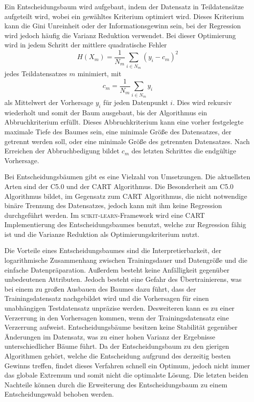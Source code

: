 Ein Entscheidungsbaum wird aufgebaut, indem der Datensatz in Teildatensätze aufgeteilt wird, wobei ein gewähltes Kriterium optimiert wird.
Dieses Kriterium
kann die Gini Unreinheit oder der Informationsgewinn sein, bei der Regression wird jedoch häufig die Varianz Reduktion verwendet.
Bei dieser Optimierung wird in jedem Schritt der mittlere quadratische Fehler
\begin{equation}
  H(X_m) = \frac{1}{N_m}\sum_{i\in N_m}(y_i-c_m)^2
\end{equation}
jedes Teildatensatzes $m$ minimiert, mit
\begin{equation}
  c_m = \frac{1}{N_m}\sum_{i\in N_m}y_i
\end{equation}
als Mittelwert der Vorhersage $y_i$ für jeden Datenpunkt $i$.
Dies wird rekursiv wiederholt und somit der Baum ausgebaut, bis der Algorithmus ein Abbruchkriterium erfüllt.
Dieses Abbruchkriterium kann eine vorher festgelegte maximale Tiefe
des Baumes sein, eine minimale Größe des Datensatzes, der getrennt werden soll, oder eine minimale Größe des getrennten Datensatzes. Nach Erreichen der Abbruchbedigung bildet
$c_m$ des letzten Schrittes die endgültige Vorhersage.

Bei Entscheidungsbäumen gibt es eine Vielzahl von Umsetzungen.
Die aktuellsten Arten sind der C5.0 und der CART Algorithmus\cite[1]{CART}.
Die Besonderheit am C5.0 Algorithmus bildet, im Gegensatz zum CART Algorithmus, die nicht notwendige binäre Trennung des Datensatzes,
jedoch kann mit ihm keine Regression durchgeführt werden.
Im \textsc{scikit-learn}-Framework\cite{scikit-learn} wird eine CART Implementierung des Entscheidungsbaumes benutzt, welche zur
Regression fähig ist und die Varianze Reduktion als Optimierungskriterium nutzt.

Die Vorteile eines Entscheidungsbaumes sind die Interpretierbarkeit, der logarithmische Zusammenhang zwischen Trainingsdauer und Datengröße und die einfache Datenpräparation.
Außerdem besteht keine Anfälligkeit gegenüber unbedeutenen Attributen.
Jedoch besteht eine Gefahr des Übertrainierens, was bei einem zu großen Ausbauen des Baumes dazu führt, dass der Trainingsdatensatz nachgebildet
wird und die Vorhersagen für einen unabhängigen Testdatensatz unpräzise werden.
Desweiteren kann es zu einer Verzerrung in den Vorhersagen kommen, wenn der Trainingsdatensatz eine Verzerrung aufweist.
Entscheidungsbäume besitzen keine Stabilität gegenüber Änderungen im Datensatz, was zu einer hohen Varianz der Ergebnisse
unterschiedlicher Bäume führt.
Da der Entscheidungsbaum zu den gierigen Algorithmen gehört, welche die Entscheidung aufgrund des derzeitig besten Gewinns treffen, findet dieses Verfahren schnell ein
Optimum, jedoch nicht immer das globale Extremum und somit nicht die optimalste Lösung.
Die letzten beiden Nachteile können durch die Erweiterung des Entscheidungsbaum zu einem Entscheidungswald behoben werden.

